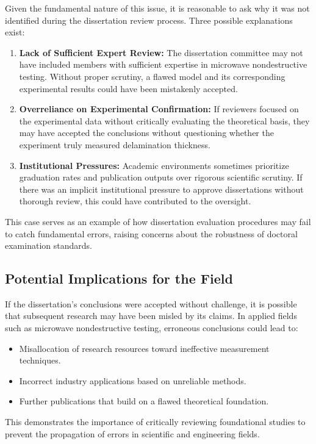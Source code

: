 \documentclass[10pt,twocolumn]{article}
\begin{document}
Given the fundamental nature of this issue, it is reasonable to ask why it was not identified during the dissertation review process. Three possible explanations exist:

\begin{enumerate}
    \item \textbf{Lack of Sufficient Expert Review:} The dissertation committee may not have included members with sufficient expertise in microwave nondestructive testing. Without proper scrutiny, a flawed model and its corresponding experimental results could have been mistakenly accepted.
    \item \textbf{Overreliance on Experimental Confirmation:} If reviewers focused on the experimental data without critically evaluating the theoretical basis, they may have accepted the conclusions without questioning whether the experiment truly measured delamination thickness.
    \item \textbf{Institutional Pressures:} Academic environments sometimes prioritize graduation rates and publication outputs over rigorous scientific scrutiny. If there was an implicit institutional pressure to approve dissertations without thorough review, this could have contributed to the oversight.
\end{enumerate}

This case serves as an example of how dissertation evaluation procedures may fail to catch fundamental errors, raising concerns about the robustness of doctoral examination standards.

\subsection{Potential Implications for the Field}

If the dissertation's conclusions were accepted without challenge, it is possible that subsequent research may have been misled by its claims. In applied fields such as microwave nondestructive testing, erroneous conclusions could lead to:
\begin{itemize}
    \item Misallocation of research resources toward ineffective measurement techniques.
    \item Incorrect industry applications based on unreliable methods.
    \item Further publications that build on a flawed theoretical foundation.
\end{itemize}

This demonstrates the importance of critically reviewing foundational studies to prevent the propagation of errors in scientific and engineering fields.
\end{document}
